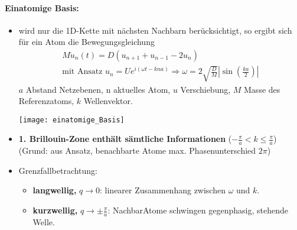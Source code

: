 \documentclass[a4paper,12pt]{article}
\begin{document}
\paragraph*{Einatomige Basis:}
\begin{itemize}
	\item wird nur die 1D-Kette mit nächsten Nachbarn berücksichtigt, so ergibt sich für ein Atom die Bewegungsgleichung \begin{align*}
	M \ddot{u}_n (t) = D \left(u_{n+1} + u_{n-1} - 2 u_n\right)\\
	\text{mit Ansatz } u_{n} = U e^{i\left(\omega t - kna\right)} \Rightarrow \omega = 2 \sqrt{\frac{D}{M}} \left|\sin\left(\frac{ka}{2}\right)\right|
	\end{align*}
	$ a $ Abstand Netzebenen, n aktuelles Atom, $ u $ Verschiebung, $ M $ Masse des Referenzatoms, $ k $ Wellenvektor.
	\begin{center}
		\texttt{[image: einatomige\_Basis]}
	\end{center}
	\item \textbf{1. Brillouin-Zone enthält sämtliche Informationen} ($ - \frac{\pi}{a} < k \le \frac{\pi}{a}$) (Grund: aus Ansatz, benachbarte Atome max. Phasenunterschied $ 2\pi $)
	\item Grenzfallbetrachtung:
	\begin{itemize}
		\item \textbf{langwellig,} $ q\rightarrow 0 $: linearer Zusammenhang zwischen $ \omega $ und $ k $.
		\item \textbf{kurzwellig,} $ q\rightarrow \pm \frac{\pi}{a} $: NachbarAtome schwingen gegenphasig, stehende Welle.
	\end{itemize}
\end{itemize}
\end{document}
